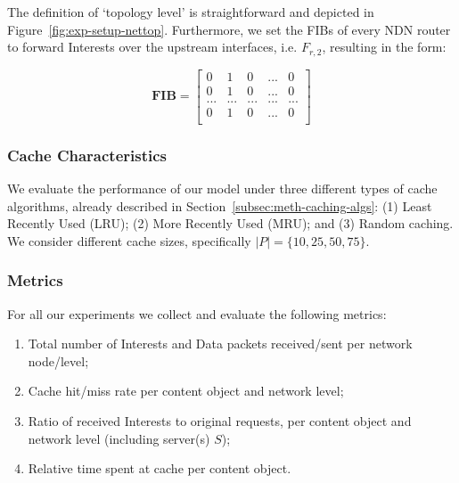 The definition of `topology level' is straightforward and depicted 
in Figure~\ref{fig:exp-setup-nettop}. Furthermore, we set the FIBs of every 
NDN router to forward Interests over the upstream interfaces, i.e. $F_{r,2}$, 
resulting in the form:

\begin{equation}
\textbf{FIB} = \begin{bmatrix} 
                0 & 1 & 0 & ... & 0                 \\ 
                0 & 1 & 0 & ... & 0                 \\ 
                ... & ... & ... & ... & ...         \\ 
                0 & 1 & 0 & ... & 0                 \\ \end{bmatrix}
    \label{eq:fib-exp}
\end{equation}\shortvertbreak

\subsubsection{Cache Characteristics}
\label{subsec:exp-setup-cache}

We evaluate the performance of our model under three different types of cache 
algorithms, already described in Section~\ref{subsec:meth-caching-algs}: (1) 
Least Recently Used (LRU); (2) More Recently Used (MRU); and (3) Random caching. We 
consider different cache sizes, specifically $|P| = \{10, 25, 50, 75\}$.\shortvertbreak

\subsubsection{Metrics}
\label{subsec:exp-setup-metrics}

For all our experiments we collect and evaluate the following metrics:

\begin{enumerate}

    \item Total number of Interests and Data packets received\slash sent per network node\slash level;
    \item Cache hit\slash miss rate per content object and network level;
    \item Ratio of received Interests to original requests, per content object 
        and network level (including server(s) $S$);
    \item Relative time spent at cache per content object.\shortvertbreak

\end{enumerate}

